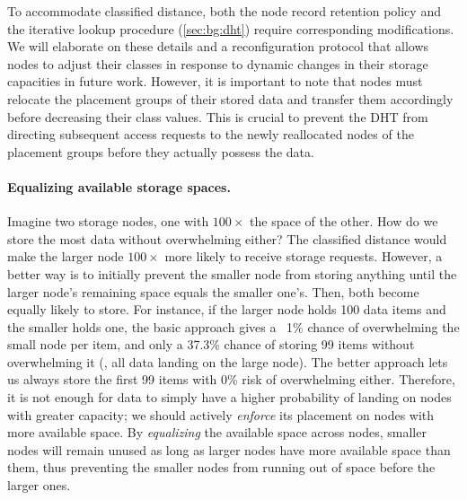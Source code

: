 To accommodate classified distance, both the node record retention policy and the iterative lookup procedure (\autoref{sec:bg:dht}) require corresponding modifications.
We will elaborate on these details and a reconfiguration protocol that allows nodes to adjust their classes in response to dynamic changes in their storage capacities in future work.
However, it is important to note that nodes must relocate the placement groups of their stored data and transfer them accordingly before decreasing their class values.
This is crucial to prevent the DHT from directing subsequent access requests to the newly reallocated nodes of the placement groups before they actually possess the data.

\paragraph{Equalizing available storage spaces.}
Imagine two storage nodes, one with $100\times$ the space of the other. How do we store the most data without overwhelming either?
The classified distance would make the larger node $100\times$ more likely to receive storage requests.
However, a better way is to initially prevent the smaller node from storing anything until the larger node's remaining space equals the smaller one's. Then, both become equally likely to store.
For instance, if the larger node holds 100 data items and the smaller holds one, the basic approach gives a ~1\% chance of overwhelming the small node per item, and only a 37.3\% chance of storing 99 items without overwhelming it (\ie, all data landing on the large node).
The better approach lets us always store the first 99 items with 0\% risk of overwhelming either.
Therefore, it is not enough for data to simply have a higher probability of landing on nodes with greater capacity; we should actively \emph{enforce} its placement on nodes with more available space.
By \emph{equalizing} the available space across nodes, smaller nodes will remain unused as long as larger nodes have more available space than them, thus preventing the smaller nodes from running out of space before the larger ones.

